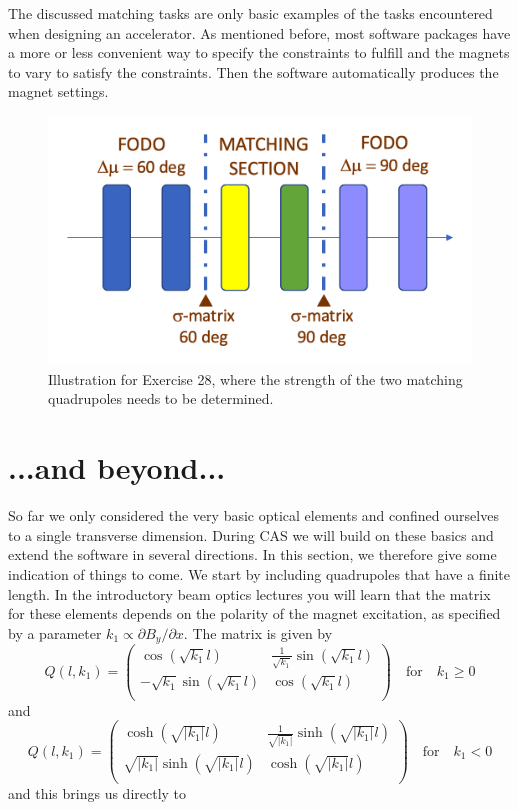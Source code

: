 \documentclass{article}
\newcommand\pt{\partial}
\begin{document}
The discussed matching tasks are only basic examples of the tasks encountered when
designing an accelerator. As mentioned before, most software packages have a 
more or less convenient way to specify the constraints to fulfill and the magnets
to vary to satisfy the constraints. Then the software automatically produces the
magnet settings. 
\begin{figure}[tb]
\begin{center}
\includegraphics[width=.7\textwidth]{_img_primer/matching.png}
\end{center}
\caption{\label{fig:matching}Illustration for Exercise 28, where the strength of 
  the two matching quadrupoles needs to be determined.}
\end{figure}
%
%
\section{...and beyond...}
%
So far we only considered the very basic optical elements and confined ourselves to
a single transverse dimension. During CAS we will build on these basics and extend
the software in several directions. In this section, we therefore give some
indication of things to come. We start by including quadrupoles that have a finite
length. In the introductory beam optics lectures you will learn that the matrix for
these elements depends on the polarity of the magnet excitation, as specified by a
parameter $k_1\propto \pt B_y/\pt x.$ The matrix is given by
\begin{equation}\label{eq:QF}
Q(l,k_1)=\left(\begin{array}{cc}
\cos(\sqrt{k_1}l) & \frac{1}{\sqrt{k_1}}\sin(\sqrt{k_1}l) \\
-\sqrt{k_1}\sin(\sqrt{k_1}l) & \cos(\sqrt{k_1}l)\\
\end{array}\right)
\quad\mathrm{for}\quad k_1 \geq 0
\end{equation} 
and 
\begin{equation}\label{eq:QD}
Q(l,k_1)=\left(\begin{array}{cc}
\cosh(\sqrt{\vert k_1\vert}l) & \frac{1}{\sqrt{\vert k_1\vert}}\sinh(\sqrt{\vert k_1\vert}l) \\
\sqrt{\vert k_1\vert}\sinh(\sqrt{\vert k_1\vert}l) & \cosh(\sqrt{\vert k_1\vert}l)\\
\end{array}\right)
\quad\mathrm{for}\quad k_1 < 0
\end{equation}
and this brings us directly to 
\end{document}
